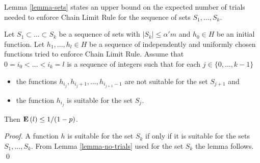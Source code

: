 Lemma \ref{lemma-sets} states an upper bound on the expected number of trials needed to enforce Chain Limit Rule for the sequence of sets $S_1, \dots, S_k$.
\begin{lemma}
\label{lemma-sets}
Let $S_1 \subset \dots \subset S_k$ be a sequence of sets with $|S_k| \leq \alpha' m$ and $h_0 \in H$ be an initial function. Let $h_1, \dots, h_l \in H$ be a sequence of independently and uniformly chosen functions tried to enforce Chain Limit Rule. Assume that \\ $0 = i_0 < \dots < i_k = l$ is a sequence of integers such that for each $j \in \{0, \dots, k - 1\}$
\begin{itemize}
\item the functions $h_{i_{j}}, h_{i_{j} + 1}, \dots, h_{i_{j + 1} - 1}$ are not suitable for the set $S_{j + 1}$ and 
\item the function $h_{i_{j}}$ is suitable for the set $S_j$.
\end{itemize}
Then $\mathbf{E}\left(l\right) \leq {1}/{(1 - p)}$.
\end{lemma}
\begin{proof}
A function $h$ is suitable for the set $S_k$ if only if it is suitable for the sets $S_1, \dots, S_k$. From Lemma \ref{lemma-no-trials} used for the set $S_k$ the lemma follows.
\qed
\end{proof}

